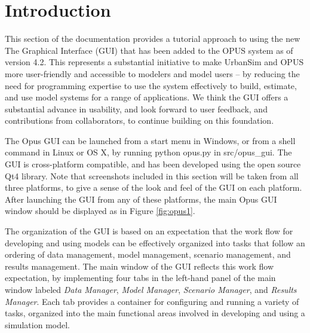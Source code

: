 \chapter{Introduction}

This section of the documentation provides a tutorial approach to using the new The Graphical Interface (GUI) that has been added to the OPUS system as of version 4.2.  This represents a substantial initiative to make UrbanSim and OPUS more user-friendly and accessible to modelers and model users -- by reducing the need for programming expertise to use the system effectively to build, estimate, and use model systems for a range of applications.  We think the GUI offers a substantial advance in usability, and look forward to user feedback, and contributions from collaborators, to continue building on this foundation.

The Opus GUI can be launched from a start menu in Windows, or from a shell command in Linux or OS X, by running python opus.py in src/opus\_gui.  The GUI is cross-platform compatible, and has been developed using the open source Qt4 library.  Note that screenshots included in this section will be taken from all three platforms, to give a sense of the look and feel of the GUI on each platform.  After launching the GUI from any of these platforms, the main Opus GUI window should be displayed as in Figure \ref{fig:opus1}. 

The organization of the GUI is based on an expectation that the work flow for developing and using models can be effectively organized into tasks that follow an ordering of data management, model management, scenario management, and results management.  The main window of the GUI reflects this work flow expectation, by implementing four tabs in the left-hand panel of the main window labeled \emph{Data Manager}, \emph{Model Manager}, \emph{Scenario Manager}, and \emph{Results Manager}.  Each tab provides a container for configuring and running a variety of tasks, organized into the main functional areas involved in developing and using a simulation model.  

